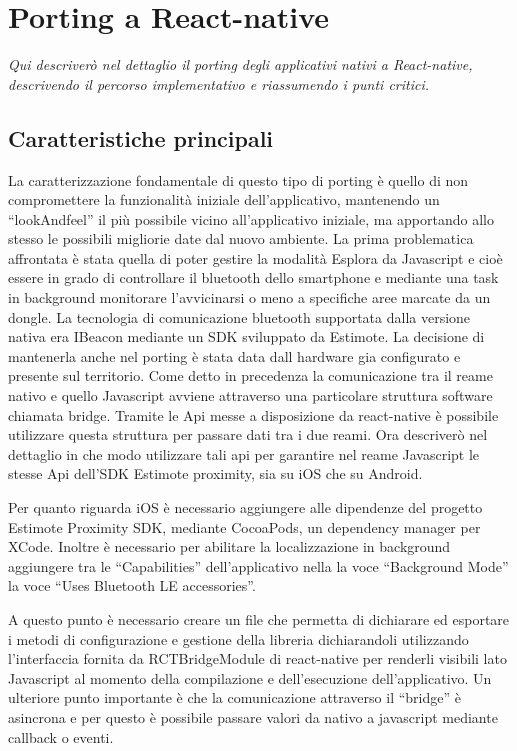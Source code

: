 \chapter{Porting a React-native}
\label{cha:intro}
\vspace{5mm}

\emph{Qui descriverò nel dettaglio il porting degli applicativi nativi a React-native, descrivendo il percorso implementativo e riassumendo i punti critici.}
\vspace{5mm}
\section{Caratteristiche principali}\vspace{5mm}

La caratterizzazione fondamentale di questo tipo di porting è quello di non compromettere la funzionalità iniziale dell’applicativo, mantenendo un “lookAndfeel” il più possibile vicino all’applicativo iniziale, ma apportando allo stesso le possibili migliorie date dal nuovo ambiente. La prima problematica affrontata è stata quella di poter gestire la modalità Esplora da Javascript e cioè essere in grado di controllare il bluetooth dello smartphone e mediante una task in background monitorare l’avvicinarsi o meno a specifiche aree marcate da un dongle. La tecnologia di comunicazione bluetooth supportata dalla versione nativa era IBeacon mediante un SDK sviluppato da Estimote. La decisione di mantenerla anche nel porting è stata data dall hardware gia configurato e presente sul territorio. Come detto in precedenza la comunicazione tra il reame nativo e quello Javascript avviene attraverso una particolare struttura software chiamata bridge. Tramite le Api messe a disposizione da react-native è possibile utilizzare questa struttura per passare dati tra i due reami. Ora descriverò nel dettaglio in che modo utilizzare tali api per garantire nel reame Javascript le stesse Api dell’SDK Estimote proximity, sia su iOS che su Android.\vspace{5mm}

Per quanto riguarda iOS è necessario aggiungere alle dipendenze del progetto Estimote Proximity SDK, mediante CocoaPods, un dependency manager per XCode. Inoltre è necessario per abilitare la localizzazione in background aggiungere tra le “Capabilities” dell’applicativo nella la voce “Background Mode” la voce “Uses Bluetooth LE accessories”. \vspace{5mm}

A questo punto è necessario creare un file che permetta di dichiarare ed esportare i metodi di configurazione e gestione della libreria dichiarandoli utilizzando l’interfaccia fornita da RCTBridgeModule  di react-native per renderli visibili lato Javascript al momento della compilazione e dell’esecuzione dell’applicativo. Un ulteriore punto importante è che la comunicazione attraverso il “bridge” è asincrona e per questo è possibile passare valori da nativo a javascript mediante callback o eventi. \vspace{5mm}

